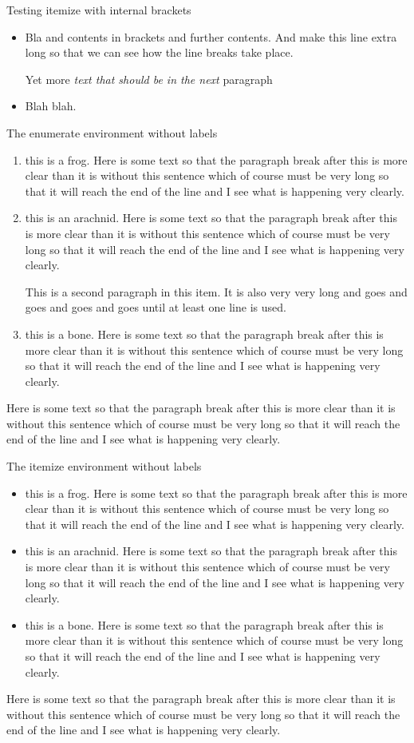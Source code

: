 \documentclass{article}
\begin{document}
Testing itemize with internal brackets
\begin{itemize}
\item Bla {and contents in brackets} and further contents.  And make this 
line extra long so that we can see how the line breaks take place.

Yet more {\it text that should be in the next} paragraph
\item Blah blah.
\end{itemize}

 The
enumerate environment without labels
\begin{enumerate}
\item this is a frog. Here is some text so that the paragraph break after this
is more clear than it is without this sentence which of
course must be very long so that it will reach the end of
the line and I see what is happening very clearly.
\item this is an arachnid. Here is some text so that the paragraph break after this
is more clear than it is without this sentence which of
course must be very long so that it will reach the end of
the line and I see what is happening very clearly.

This is a second paragraph in this item.  It is also
very very long and goes and goes and goes and goes until
at least one line is used.

\item this is a bone. Here is some text so that the paragraph break after this
is more clear than it is without this sentence which of
course must be very long so that it will reach the end of
the line and I see what is happening very clearly.
\end{enumerate}
Here is some text so that the paragraph break after this
is more clear than it is without this sentence which of
course must be very long so that it will reach the end of
the line and I see what is happening very clearly.

The itemize environment without labels
\begin{itemize}
\item this is a frog. Here is some text so that the paragraph break after this
is more clear than it is without this sentence which of
course must be very long so that it will reach the end of
the line and I see what is happening very clearly.
\item this is an arachnid. Here is some text so that the paragraph break after this
is more clear than it is without this sentence which of
course must be very long so that it will reach the end of
the line and I see what is happening very clearly.
\item this is a bone. Here is some text so that the paragraph break after this
is more clear than it is without this sentence which of
course must be very long so that it will reach the end of
the line and I see what is happening very clearly.
\end{itemize}
Here is some text so that the paragraph break after this
is more clear than it is without this sentence which of
course must be very long so that it will reach the end of
the line and I see what is happening very clearly.
\end{document}
